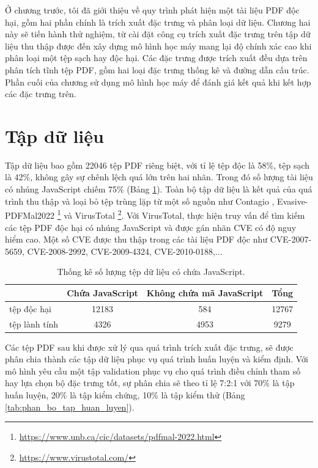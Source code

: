 \documentclass[./../main.tex]{subfiles}
\begin{document}
Ở chương trước, tôi đã giới thiệu về quy trình phát hiện một tài liệu PDF độc hại, gồm hai phần chính là trích xuất đặc trưng và phân loại dữ liệu. Chương hai này sẽ tiến hành thử nghiệm, từ cài đặt công cụ trích xuất đặc trưng trên tập dữ liệu thu thập được đến xây dựng mô hình học máy mang lại độ chính xác cao khi phân loại một tệp sạch hay độc hại. Các đặc trưng được trích xuất đều dựa trên phân tích tĩnh tệp PDF, gồm hai loại đặc trưng thống kê và đường dẫn cấu trúc. Phần cuối của chương sử dụng mô hình học máy để đánh giá kết quả khi kết hợp các đặc trưng trên.

\section{Tập dữ liệu}
Tập dữ liệu bao gồm 22046 tệp PDF riêng biệt, với tỉ lệ tệp độc là 58\%, tệp sạch là 42\%, không gây sự chênh lệch quá lớn trên hai nhãn. Trong đó số lượng tài liệu có nhúng JavaScript chiếm 75\% (Bảng \ref{tab:data_contain_JavaScript}). Toàn bộ tập dữ liệu là kết quả của quá trình thu thập và loại bỏ tệp trùng lặp từ một số nguồn như Contagio \cite{contagio}, Evasive-PDFMal2022 \footnote{\url{https://www.unb.ca/cic/datasets/pdfmal-2022.html}} và VirusTotal \footnote{\url{https://www.virustotal.com/}}. Với VirusTotal, thực hiện truy vấn để tìm kiếm các tệp PDF độc hại có nhúng JavaScript và được gán nhãn CVE có độ nguy hiểm cao. Một số CVE được thu thập trong các tài liệu PDF độc như CVE-2007-5659, CVE-2008-2992, CVE-2009-4324, CVE-2010-0188,...

\begin{table}[]
	\centering
	\caption{Thống kê số lượng tệp dữ liệu có chứa JavaScript.}
	\label{tab:data_contain_JavaScript}
	\begin{tabular}{|l|c|c|c|}
		\hline
		              & Chứa JavaScript & Không chứa mã JavaScript & Tổng  \\ \hline
		tệp độc hại   & 12183           & 584                      & 12767 \\ \hline
		tệp lành tính & 4326            & 4953                     & 9279  \\ \hline
	\end{tabular}
\end{table}

Các tệp PDF sau khi được xử lý qua quá trình trích xuất đặc trưng, sẽ được phân chia thành các tập dữ liệu phục vụ quá trình huấn luyện và kiểm định. Với mô hình yêu cầu một tập validation phục vụ cho quá trình điều chỉnh tham số hay lựa chọn bộ đặc trưng tốt, sự phân chia sẽ theo tỉ lệ 7:2:1 với 70\% là tập huấn luyện, 20\% là tập kiểm chứng, 10\% là tập kiểm thử (Bảng \ref{tab:phan_bo_tap_huan_luyen}).
\end{document}
